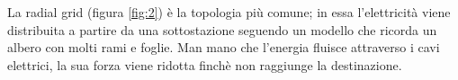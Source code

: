 \begin{figure}[h]
\end{figure}

La radial grid (figura \ref{fig:2}) è la topologia più comune; in essa l'elettricità viene distribuita a partire da una sottostazione seguendo un modello che ricorda un albero con molti rami e foglie.
Man mano che l'energia fluisce attraverso i cavi elettrici, la sua forza viene ridotta finchè non raggiunge la destinazione.

